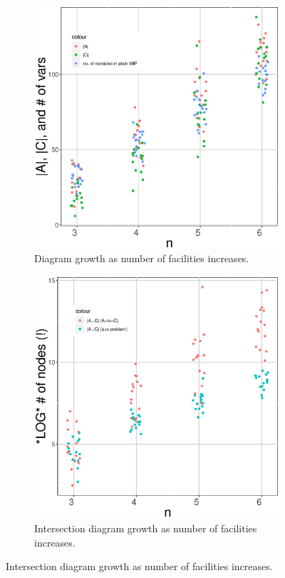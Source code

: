 \documentclass[11pt]{article}
\begin{document}
\begin{figure}
  \begin{subfigure}{0.45\textwidth}
    \includegraphics[width=\textwidth]{AandCsizes.eps}
    \caption{Diagram growth as number of facilities increases.}
    \label{fig:ACsizes}
  \end{subfigure}
  \hfill
  \begin{subfigure}{0.45\textwidth}
    \includegraphics[width=\textwidth]{inter_size.eps}
    \caption{Intersection diagram growth as number of facilities increases.}
    \label{fig:intSizes}
  \end{subfigure}
\end{figure}
\end{document}
